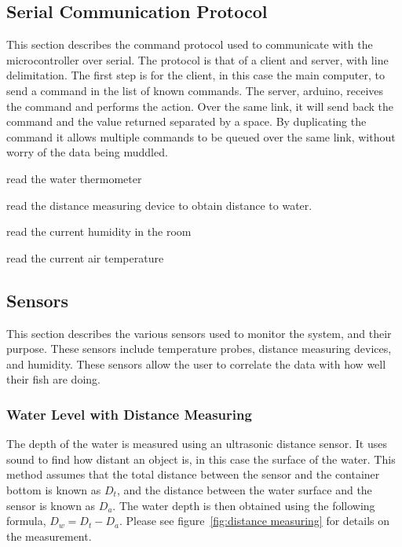 \documentclass[american,12pt]{article}
\begin{document}
\subsection{Serial Communication Protocol}
This section describes the command protocol used to communicate with the
microcontroller over serial. The protocol is that of a client and server,
with line delimitation. The first step is for the client, in this case the
main computer, to send a command in the list of known commands. The server,
arduino, receives the command and performs the action. Over the same link, it
will send back the command and the value returned separated by a space. By
duplicating the command it allows multiple commands to be queued over the same
link, without worry of the data being muddled.

\begin{description}[style=nextline]
    \item[rWatThm] read the water thermometer
    \item[rdWaLvl] read the distance measuring device to obtain distance to water.
    \item[rdHumid] read the current humidity in the room
    \item[rdAirTm] read the current air temperature
\end{description}

\subsection{Sensors}
This section describes the various sensors used to monitor the system, and their
purpose. These sensors include temperature probes, distance measuring devices,
and humidity. These sensors allow the user to correlate the data with how well
their fish are doing.

\subsubsection{Water Level with Distance Measuring}
The depth of the water is measured using an ultrasonic distance sensor. It uses
sound to find how distant an object is, in this case the surface of the water.
This method assumes that the total distance between the sensor and the container
bottom is known as $D_t$, and the distance between the water surface and the sensor
is known as $D_a$. The water depth is then obtained using the following formula,
$D_w = D_t - D_a$. Please see figure~\ref{fig:distance measuring} for details on the
measurement.
\end{document}
